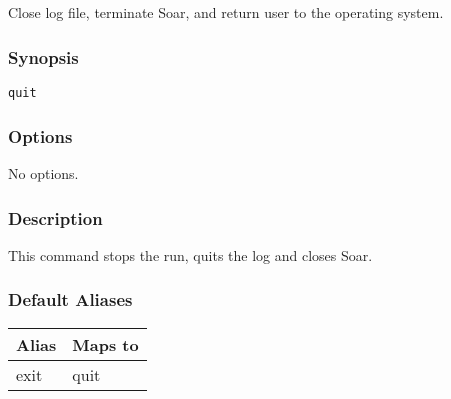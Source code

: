 \subsection{}
\label{quit}
Close log file, terminate Soar, and return user to the operating system. 
\subsubsection*{Synopsis}
\begin{verbatim}
quit
\end{verbatim}
\subsubsection*{Options}
 No options. 
\subsubsection*{Description}
 This command stops the run, quits the log and closes Soar. 
\subsubsection*{Default Aliases}
\begin{tabular}{|l|l|}
\hline 
 Alias  & Maps to  \\
 \hline 
 exit  & quit  \\
 \hline 
\end{tabular}
